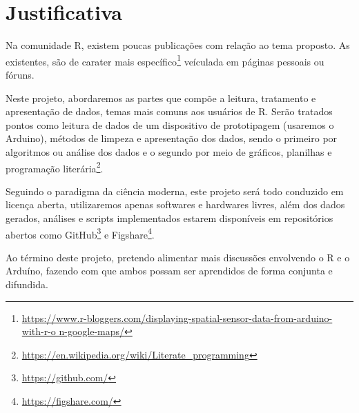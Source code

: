 \chapter[Justificativa]{Justificativa}


Na comunidade R, existem poucas publicações com relação ao tema proposto. As existentes, são de carater mais 
específico\footnote{\url{https://www.r-bloggers.com/displaying-spatial-sensor-data-from-arduino-with-r-o
n-google-maps/}} veículada em páginas pessoais ou fóruns. 

Neste projeto, abordaremos as partes que compõe a leitura, tratamento e 
apresentação de dados, temas mais comuns aos usuários de R. Serão tratados 
pontos como leitura de dados de um dispositivo de prototipagem (usaremos o 
Arduino), métodos de limpeza e apresentação dos dados, sendo o primeiro por 
algoritmos ou análise dos dados e o segundo por meio de gráficos, planilhas e 
programação literária\footnote{\url{https://en.wikipedia.org/wiki/Literate_programming}}.

Seguindo o paradigma da ciência moderna, este projeto será todo conduzido em 
licença aberta, utilizaremos apenas softwares e hardwares livres, além dos dados 
gerados, análises e scripts implementados estarem disponíveis em repositórios 
abertos como GitHub\footnote{\url{https://github.com/}} e Figshare\footnote{\url{https://figshare.com/}}.

Ao término deste projeto, pretendo alimentar mais discussões envolvendo o R e o 
Arduíno, fazendo com que ambos possam ser aprendidos de forma conjunta e 
difundida. 

